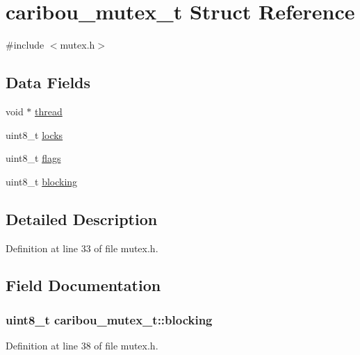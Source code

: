 \hypertarget{structcaribou__mutex__t}{\section{caribou\-\_\-mutex\-\_\-t Struct Reference}
\label{structcaribou__mutex__t}
}


{\ttfamily \#include $<$mutex.\-h$>$}

\subsection*{Data Fields}
\begin{DoxyCompactItemize}
\item 
void $\ast$ \hyperlink{structcaribou__mutex__t_aa286035f1540359f0cd4f0de4a127304}{thread}
\item 
uint8\-\_\-t \hyperlink{structcaribou__mutex__t_a630c7c086d3492ef2f4ff58a3f7003cc}{locks}
\item 
uint8\-\_\-t \hyperlink{structcaribou__mutex__t_aa263fae88561085ee83fde049b400351}{flags}
\item 
uint8\-\_\-t \hyperlink{structcaribou__mutex__t_a58c4476d2113705569509e239501ae86}{blocking}
\end{DoxyCompactItemize}


\subsection{Detailed Description}


Definition at line 33 of file mutex.\-h.



\subsection{Field Documentation}
\hypertarget{structcaribou__mutex__t_a58c4476d2113705569509e239501ae86}{
\subsubsection[{blocking}]{\setlength{\rightskip}{0pt plus 5cm}uint8\-\_\-t caribou\-\_\-mutex\-\_\-t\-::blocking}}\label{structcaribou__mutex__t_a58c4476d2113705569509e239501ae86}


Definition at line 38 of file mutex.\-h.

